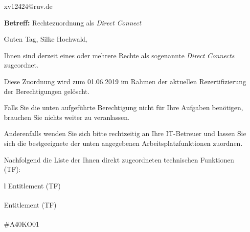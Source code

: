 \documentclass[a4paper,landscape,12pt]{letter}
\begin{document}
\begin{letter}{xv12424@ruv.de\hfill \break}
\begin{normalsize}
	\opening{\textbf{Betreff:} Rechtezuordnung als \emph{Direct Connect}}
	\begin{normalsize} \hfill
	\end{normalsize}

	\begin{normalsize}
		Guten Tag, 
	Silke Hochwald, \hfill \break
	\end{normalsize}
	\end{normalsize}
	
\begin{normalsize}
	Ihnen sind derzeit eines oder mehrere Rechte als sogenannte \emph{Direct Connects} zugeordnet.
	
	Diese Zuordnung wird zum 01.06.2019 im Rahmen der aktuellen Rezertifizierung der Berechtigungen gelöscht.
	
	Falls Sie die unten aufgeführte Berechtigung nicht für Ihre Aufgaben benötigen, 
	brauchen Sie nichts weiter zu veranlassen.
	
	Anderenfalls wenden Sie sich bitte rechtzeitig an Ihre IT-Betreuer 
	und lassen Sie sich die bestgeeignete der unten angegebenen Arbeitsplatzfunktionen zuordnen.
	\end{normalsize}
	
\begin{normalsize}
	Nachfolgend die Liste der Ihnen direkt zugeordneten technischen Funktionen (TF):

	\begin{longtable}{l}
		Entitlement (TF) \\ \hline
		\endfirsthead
		\\\hline
		Entitlement (TF) \\ \hline
		\endhead %
		\multicolumn{1}{r@{}}{Fortsetzung \ldots}\\
		\endfoot
		\hline
		\endlastfoot
	\#A40KO01\\
	\end{longtable}
	\end{normalsize}
	

\end{letter}
\end{document}
